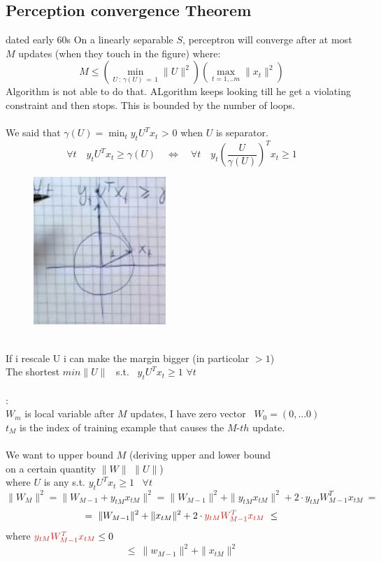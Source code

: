 \documentclass[../main.tex]{subfiles}
\begin{document}
\subsection{Perception convergence Theorem}
dated early 60s
On a linearly separable $S$, perceptron will converge after at most $M$ updates (when they touch in the figure) where:
$$
M \leq \left( \min_{U \, : \, \gamma(U) \, =\,1} \| U \|^2 \right)  \left( \max_{t=1,..m} \| x_t\|^2\right)
$$
Algorithm is not able to do that. ALgorithm keeps looking till he get a violating constraint and then stops. This is bounded by the number of loops. 
\\\\
We said that $\gamma(U) = \min_{t} y_t U^T x_t$ > 0 \qquad when $U$ is separator.
\\
$$ \forall t \quad y_t U^T x_t \geq \gamma(U) \quad \Leftrightarrow \quad \forall t \quad y_t \left( \frac{U}{\gamma(U)} \right)^T x_t \geq 1
$$
\begin{figure}[h]
    \centering
    \includegraphics[width=0.3\linewidth]{../img/lez13-img6.JPG}
    \caption{}
\end{figure}\\
If i rescale U i can make the margin bigger (in particolar $> 1$)\\
The shortest $min \| U \|$ \ s.t. \ $y_t U^T x_t \geq 1$ \quad $\forall t$
\\\\
:
\\
$W_m$ is local variable after $M$ updates, I have zero vector \ $W_0 = (0,...0)$
\\
$t_M$ is the index of training example that causes the $M$-$th$ update.\\\\
We want to upper bound $M$ (deriving upper and lower bound \\on a certain quantity $\| W \|$ $\| U\|$)
\\
where $U$ is any s.t. $y_t U^T x_t \geq 1$ \ $\forall t$ 
$$
\| W_M\|^2 = \|W_{M-1} + y_{tM} x_{tM} \|^2 = \|W_{M-1}\|^2 + \|  y_{tM} x_{tM} \|^2 + 2 \cdot y_{tM} W_{M-1}^T x_{tM} \ = 
$$
$$
= \  \|W_{M-1}\|^2 + \| x_{tM}\|^2 + 2 \cdot \red{y_{tM} W^T_{M-1} x_{tM}} \ \leq
$$
where $\red{y_{tM} W^T_{M-1} x_{tM}} \leq 0$
$$
\leq  \ \| w_{M-1}\|^2 + \| x_{tM}\|^2
$$
\end{document}
